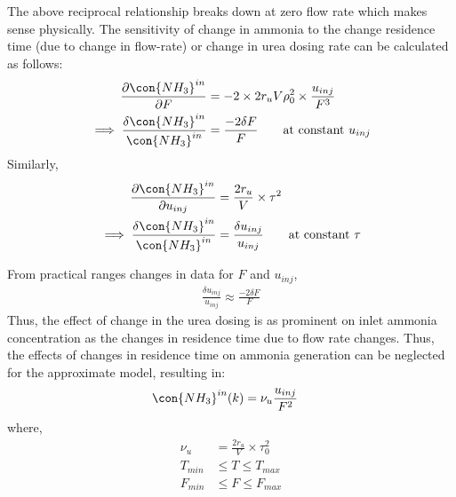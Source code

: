 The above reciprocal relationship breaks down at zero flow rate which makes sense physically.
The sensitivity of change in ammonia to the change residence time (due to change in flow-rate) or change in urea dosing rate can be calculated as follows:
\begin{align*}
    \frac{\partial \con{NH_3}^{in} }{\partial F} &= -2 \times 2r_u V \rho^2_0 \times \frac{u_{inj}}{F^3} \\
    \implies \frac{\delta \con{NH_3}^{in}}{\con{NH_3}^{in}} &= \frac{-2 \delta F}{F}
    \qquad \text{at constant } u_{inj}
\end{align*}
Similarly,
\begin{align*}
    \frac{\partial \con{NH_3}^{in} }{\partial u_{inj}} &= \frac{2 r_u}{V} \times \tau^2 \\
    \implies \frac{\delta \con{NH_3}^{in}}{\con{NH_3}^{in}} &= \frac{ \delta u_{inj}}{u_{inj}} \qquad \text{at constant } \tau
\end{align*}

From practical ranges changes in data for $F$ and $u_{inj}$,
\begin{align*}
    \frac{ \delta u_{inj}}{u_{inj}} \approx \frac{-2 \delta F}{F}
\end{align*}
Thus, the effect of change in the urea dosing is as prominent on inlet ammonia concentration as the changes in residence time due to flow rate changes. Thus, the effects of changes in residence time on ammonia generation can be neglected for the approximate model, resulting in:
\begin{align}
    \con{NH_3}^{in}(k) &= \nu_u \frac{u_{inj}}{F^2}    \label{eqn::urea_inj}
\end{align}
where,
\begin{align*}
    \nu_u &= \frac{2 r_u}{V} \times \tau_0^2 \\
    T_{min} &\leq T \leq T_{max}\\
    F_{min} &\leq F \leq F_{max}
\end{align*}
